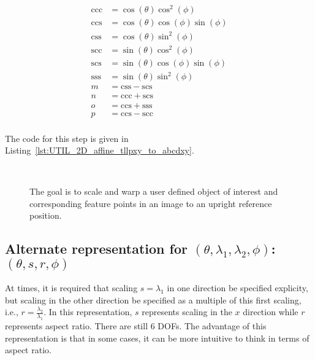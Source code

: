 \begin{equation*}
\begin{array}{llll}
\mathrm{ccc} &= \cos(\theta) \cos^2(\phi)\\
\mathrm{ccs} &= \cos(\theta) \cos(\phi) \sin(\phi)\\
\mathrm{css} &= \cos(\theta) \sin^2(\phi)\\
\mathrm{scc} &= \sin(\theta) \cos^2(\phi) \\
\mathrm{scs} &= \sin(\theta) \cos(\phi) \sin(\phi)\\
\mathrm{sss} &= \sin(\theta) \sin^2(\phi)\\
m   &=  \mathrm{css} - \mathrm{scs}\\
n  &=  \mathrm{ccc} + \mathrm{scs}\\
o   &= \mathrm{ccs} + \mathrm{sss}\\
p   &=  \mathrm{ccs} - \mathrm{scc}\\
\end{array}
\end{equation*}

The code for this step is given in Listing~\ref{lst:UTIL_2D_affine_tllpxy_to_abcdxy}.

								\begin{figure}[t]
								\centering
								\\
								\caption{The goal is to scale and warp a user defined object of interest and corresponding feature points in an image to an upright reference position.}
								\label{Fig:goal}
								\end{figure}

\subsection{Alternate representation for $(\theta, \lambda_1, \lambda_2, \phi)$: $(\theta, s, r, \phi)$}
At times, it is required that scaling $s=\lambda_1$ in one direction be specified explicity, but scaling in the other direction be specified as a multiple of this first scaling, i.e., $r=\frac{\lambda_2}{\lambda_1}$.  In this representation, $s$ represents scaling in the $x$ direction while $r$ represents aspect ratio.  There are still 6 DOFs.  The advantage of this representation is that in some cases, it can be more intuitive to think in terms of aspect ratio.  

